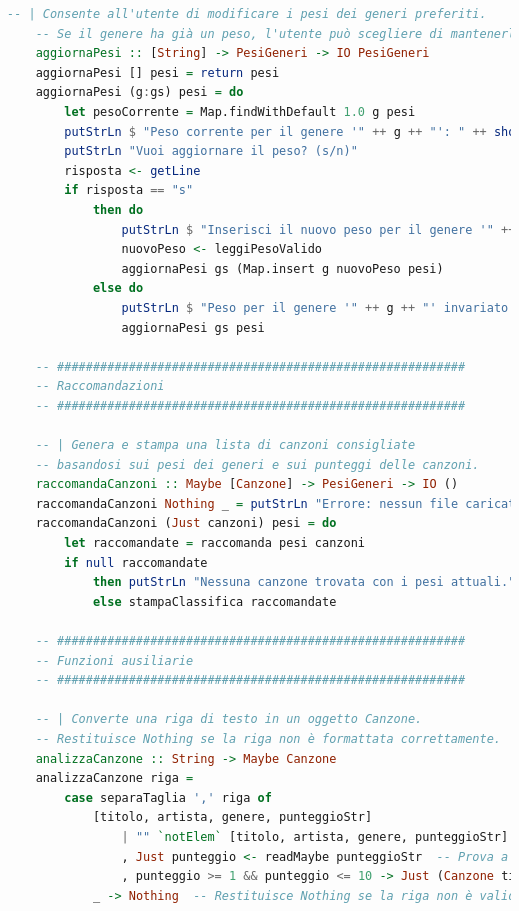 \documentclass[a4paper,11pt]{article}
\begin{document}
\begin{lstlisting}[language=Haskell]
    -- | Consente all'utente di modificare i pesi dei generi preferiti.
    -- Se il genere ha già un peso, l'utente può scegliere di mantenerlo o aggiornarlo.
    aggiornaPesi :: [String] -> PesiGeneri -> IO PesiGeneri
    aggiornaPesi [] pesi = return pesi
    aggiornaPesi (g:gs) pesi = do
        let pesoCorrente = Map.findWithDefault 1.0 g pesi
        putStrLn $ "Peso corrente per il genere '" ++ g ++ "': " ++ show pesoCorrente
        putStrLn "Vuoi aggiornare il peso? (s/n)"
        risposta <- getLine
        if risposta == "s"
            then do
                putStrLn $ "Inserisci il nuovo peso per il genere '" ++ g ++ "':"
                nuovoPeso <- leggiPesoValido
                aggiornaPesi gs (Map.insert g nuovoPeso pesi)
            else do
                putStrLn $ "Peso per il genere '" ++ g ++ "' invariato."
                aggiornaPesi gs pesi
    
    -- #########################################################
    -- Raccomandazioni
    -- #########################################################
    
    -- | Genera e stampa una lista di canzoni consigliate
    -- basandosi sui pesi dei generi e sui punteggi delle canzoni.
    raccomandaCanzoni :: Maybe [Canzone] -> PesiGeneri -> IO ()
    raccomandaCanzoni Nothing _ = putStrLn "Errore: nessun file caricato. Carica un file prima di continuare."
    raccomandaCanzoni (Just canzoni) pesi = do
        let raccomandate = raccomanda pesi canzoni
        if null raccomandate
            then putStrLn "Nessuna canzone trovata con i pesi attuali."
            else stampaClassifica raccomandate
    
    -- #########################################################
    -- Funzioni ausiliarie
    -- #########################################################
    
    -- | Converte una riga di testo in un oggetto Canzone.
    -- Restituisce Nothing se la riga non è formattata correttamente.
    analizzaCanzone :: String -> Maybe Canzone
    analizzaCanzone riga =
        case separaTaglia ',' riga of
            [titolo, artista, genere, punteggioStr]
                | "" `notElem` [titolo, artista, genere, punteggioStr]  -- Controlla che tutte le parti siano non vuote
                , Just punteggio <- readMaybe punteggioStr  -- Prova a leggere il punteggio
                , punteggio >= 1 && punteggio <= 10 -> Just (Canzone titolo artista genere punteggio)  -- Verifica che il punteggio sia valido
            _ -> Nothing  -- Restituisce Nothing se la riga non è valida
    

\end{lstlisting}
\end{document}
